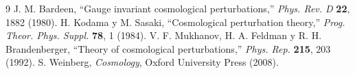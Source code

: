 \documentclass[12pt,a4paper]{article}
\begin{document}
\begin{thebibliography}{9}
 J. M. Bardeen, ``Gauge invariant cosmological perturbations,'' \textit{Phys. Rev. D} \textbf{22}, 1882 (1980).
 H. Kodama y M. Sasaki, ``Cosmological perturbation theory,'' \textit{Prog. Theor. Phys. Suppl.} \textbf{78}, 1 (1984).
 V. F. Mukhanov, H. A. Feldman y R. H. Brandenberger, ``Theory of cosmological perturbations,'' \textit{Phys. Rep.} \textbf{215}, 203 (1992).
 S. Weinberg, \textit{Cosmology}, Oxford University Press (2008).
\end{thebibliography}
\end{document}
